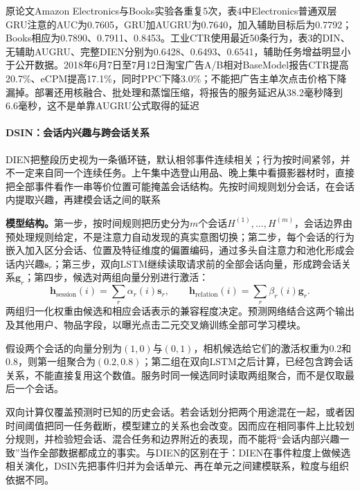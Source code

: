 原论文Amazon Electronics与Books实验各重复5次，表4中Electronics普通双层GRU注意的AUC为0.7605，GRU加AUGRU为0.7640，加入辅助目标后为0.7792；Books相应为0.7890、0.7911、0.8453。工业CTR使用最近50条行为，表3的DIN、无辅助AUGRU、完整DIEN分别为0.6428、0.6493、0.6541，辅助任务增益明显小于公开数据。2018年6月7日至7月12日淘宝广告A/B相对BaseModel报告CTR提高20.7\%、eCPM提高17.1\%，同时PPC下降3.0\%；不能把广告主单次点击价格下降漏掉。部署还用核融合、批处理和蒸馏压缩，将报告的服务延迟从38.2毫秒降到6.6毫秒，这不是单靠AUGRU公式取得的延迟

\paragraph{DSIN：会话内兴趣与跨会话关系}
\label{sec:rs-dsin}

DIEN把整段历史视为一条循环链，默认相邻事件连续相关；行为按时间紧邻，并不一定来自同一个连续任务。上午集中选登山用品、晚上集中看摄影器材时，直接把全部事件看作一串等价位置可能掩盖会话结构。先按时间规则划分会话，在会话内提取兴趣，再建模会话之间的联系

\textbf{模型结构。}第一步，按时间规则把历史分为$m$个会话$H^{(1)},\ldots,H^{(m)}$，会话边界由预处理规则给定，不是注意力自动发现的真实意图切换；第二步，每个会话的行为嵌入加入区分会话、位置及特征维度的偏置编码，通过多头自注意力和池化形成会话内兴趣$\bm{s}_r$；第三步，双向LSTM继续读取请求前的全部会话向量，形成跨会话关系$\bm{g}_r$；第四步，候选对两组向量分别进行激活：
\begin{equation}
  \bm{h}_{\mathrm{session}}(i)=\sum_r\alpha_r(i)\bm{s}_r,\qquad
  \bm{h}_{\mathrm{relation}}(i)=\sum_r\beta_r(i)\bm{g}_r.
  \label{eq:rs-dsin-pooling}
\end{equation}
两组归一化权重由候选和相应会话表示的兼容程度决定。预测网络结合这两个输出及其他用户、物品字段，以曝光点击二元交叉熵训练全部可学习模块。

假设两个会话的向量分别为$(1,0)$与$(0,1)$，相机候选给它们的激活权重为0.2和0.8，则第一组聚合为$(0.2,0.8)$；第二组在双向LSTM之后计算，已经包含跨会话关系，不能直接复用这个数值。服务时同一候选同时读取两组聚合，而不是仅取最后一个会话。

双向计算仅覆盖预测时已知的历史会话。若会话划分把两个用途混在一起，或者因时间阈值把同一任务截断，模型建立的关系也会改变。因而应在相同事件上比较划分规则，并检验短会话、混合任务和边界附近的表现，而不能将“会话内部兴趣一致”当作全部数据都成立的事实。与DIEN的区别在于：DIEN在事件粒度上做候选相关演化，DSIN先把事件归并为会话单元、再在单元之间建模联系，粒度与组织依据不同。

